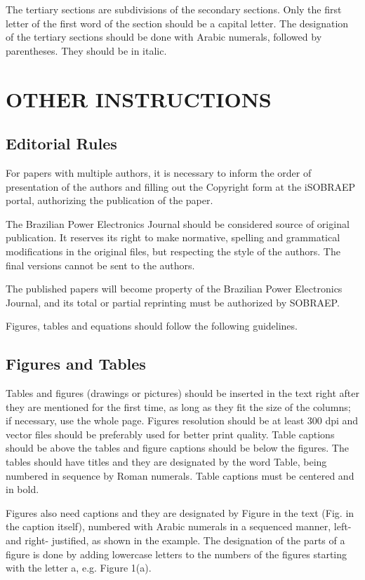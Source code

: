 \documentclass[english]{sobraep}
\begin{document}
The tertiary sections are subdivisions of the secondary sections. Only the first letter of the first word of the section should be a capital letter. The designation of the tertiary sections should be done with Arabic numerals, followed by parentheses. They should be in italic.

\section{OTHER INSTRUCTIONS}

\subsection{Editorial Rules}

For papers with multiple authors, it is necessary to inform the order of presentation of the authors and filling out the Copyright form at the iSOBRAEP portal, authorizing the publication of the paper.

The Brazilian Power Electronics Journal should be considered source of original publication. It reserves its right to make normative, spelling and grammatical modifications in the original files, but respecting the style of the authors. The final versions cannot be sent to the authors.

The published papers will become property of the Brazilian Power Electronics Journal, and its total or partial reprinting must be authorized by SOBRAEP.

Figures, tables and equations should follow the following guidelines.

\subsection{Figures and Tables}

Tables and figures (drawings or pictures) should be inserted in the text right after they are mentioned for the first time, as long as they fit the size of the columns; if necessary, use the whole page. Figures resolution should be at least 300 dpi and vector files should be preferably used for better print quality. Table captions should be above the tables and figure captions should be below the figures. The tables should have titles and they are designated by the word Table, being numbered in sequence by Roman numerals. Table captions must be centered and in bold.

Figures also need captions and they are designated by Figure in the text (Fig. in the caption itself), numbered with Arabic numerals in a sequenced manner, left- and right- justified, as shown in the example. The designation of the parts of a figure is done by adding lowercase letters to the numbers of the figures starting with the letter a, e.g. Figure 1(a).
\end{document}
